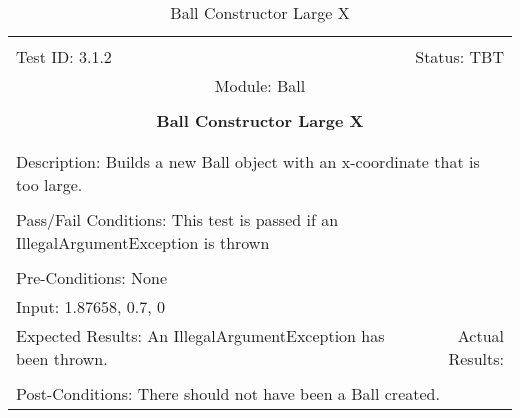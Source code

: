 \documentclass[titlepage]{article}
\begin{document}
\begin{center}%
\begin{table}
\begin{tabular}{|l r|}\hline&\\[-2mm]
	Test ID: 3.1.2	&Status: TBT\\[-3mm]
	\multicolumn{2}{|c|}{Module: Ball}\\&\\
	\multicolumn{2}{|c|}{\textbf{\large{Ball Constructor Large X}}}\\&\\\hline&\\[-3mm]
	\multicolumn{2}{|p{\textwidth}|}{Description: Builds a new Ball object with an x-coordinate that is too large.}\\[1mm]\hline&\\[-3mm]
	\multicolumn{2}{|p{\textwidth}|}{Pass/Fail Conditions: This test is passed if an IllegalArgumentException is thrown}\\[1mm]\hline&\\[-3mm]
	\multicolumn{2}{|p{\textwidth}|}{Pre-Conditions: None}\\[4mm]
	\multicolumn{2}{|p{\textwidth}|}{Input: 1.87658, 0.7, 0}\\[2mm]\hline
	\multicolumn{1}{|p{0.49\textwidth}}{Expected Results: An IllegalArgumentException has been thrown.}	&\multicolumn{1}{|p{0.45\textwidth}|}{Actual Results:}\\\hline&\\[-3mm]
	\multicolumn{2}{|p{\textwidth}|}{Post-Conditions: There should not have been a Ball created.}\\\hline
\end{tabular}
\caption{Ball Constructor Large X}
\end{table}
\end{center}
\end{document}
